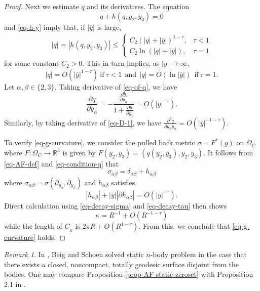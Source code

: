 \documentclass[12pt]{amsart}
\theoremstyle{remark}
\newtheorem{remark}{Remark}[section]
\numberwithin{equation}{section}
\newcommand{\R}{\mathbb R}
\newcommand{\be}{\begin{equation}}
\newcommand{\ee}{\end{equation}}
\newcommand{\bee}{\begin{equation*}}
\newcommand{\eee}{\end{equation*}}
\def\p{\partial}
\def\lf{\left}
\def\ri{\right}
\def\a{\alpha}
\begin{document}
\begin{proof}
Next we estimate $ q $ and its derivatives.
The equation
 \be \label{eq-of-q}
 q + h (q, y_2, y_3) = 0
 \ee
 and \eqref{eq-h-y}   imply that, if $|\bar{y}|$ is large,
\bee
\begin{split}
  | q |  =    | h (q, y_2, y_3)|
  \le
  \lf\{
  \begin{array}{ll}
  C_2 \lf(   |q | +  |\bar{y} | \ri)^{1-\tau} , & \tau < 1 \\
  C _2 \ln \lf( | q | + | \bar{y}  | \ri) , & \tau = 1
  \end{array}
  \ri.
\end{split}
\eee
for some constant $ C_2 > 0 $.
This in turn implies, as $ | \bar{y}|\rightarrow \infty$,
\bee \label{eq-q-1over2}
| q | = O  ( | \bar{y} |^{1-\tau} )  \ \mathrm{if} \ \tau < 1 \ \ \mathrm{and} \ \
| q | = O (  \ln { |\bar{y}|} ) \ \ \mathrm{if} \ \tau = 1.
\eee
Let $ \a, \beta \in \{ 2, 3 \}$.
Taking derivative of \eqref{eq-of-q}, we have
\be \label{eq-D-1}
\frac{ \p q}{\p y_\alpha  } = -  \frac{ \frac{ \p h}{\p y_\alpha } } {  1 + \frac{\p h}{\p y_1 } } = O ( | \bar{y} |^{ -\tau } ).
\ee
Similarly,  by taking derivative of \eqref{eq-D-1}, we have
$ \displaystyle \frac{ \p^2 q}{\p y_\beta  y_\alpha } = O ( | \bar{y}|^{-1-\tau} )$.


To verify \eqref{eq-g-curvature}, we   consider  the pulled back  metric
$ \sigma = F^* ( g) $ on $ \Omega_C$
where $ F: \Omega_C \rightarrow \R^3  $ is given by $ F  (y_2, y_3) = ( q (y_2, y_3) , y_2, y_3 ) $.
It follows from \eqref{eq-AF-def} and  \eqref{eq-condition-q}
that
\be \label{eq-decay-sigma}
\sigma_{\alpha \beta} = \delta_{\alpha \beta} + h_{\alpha \beta}
\ee
where  $ \sigma_{\alpha \beta} = \sigma (\p_{y_\alpha}, \p_{y_\beta} ) $ and
$ h_{\alpha \beta} $ satisfies
\be \label{eq-decay-tau}
| h_{\alpha \beta} | + | \bar{y} | | \p  h_{\alpha \beta} | = O ( | \bar{y} |^{-\tau} ) .
\ee
Direct calculation using \eqref{eq-decay-sigma} and \eqref{eq-decay-tau} then shows
\be \label{eq-kappa}
{\kappa} = R^{-1}  + O( R^{-1- \tau} )
\ee
while the length of $ C_{_R} $ is $ 2 \pi R + O (R^{1-\tau} )$.
From this, we conclude that \eqref{eq-g-curvature} holds.
\end{proof}

\begin{remark}
In \cite{Beig-Schoen}, Beig and Schoen solved static $n$-body problem
in the case that there exists a closed, noncompact, totally geodesic surface
disjoint from the bodies. One may compare Proposition \ref{prop-AF-static-zeroset}
with Proposition 2.1 in \cite{Beig-Schoen}.
\end{remark}
\end{document}
